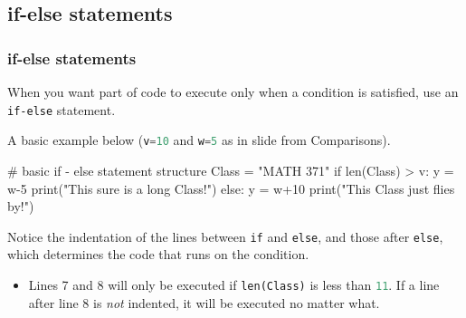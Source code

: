 \documentclass{beamer}
\newenvironment{codeblock}
    {\hfill\begin{beamerboxesrounded}[lower=codecol, width=0.8\textwidth]
    \medskip

    }
    { 
    \end{beamerboxesrounded}\hfill
    }
\theoremstyle{example}
\newcommand{\ct}[1]{\lstinline[language=Python]!#1!}
\newcommand{\ttt}[1]{{\small\texttt{#1}}}
\begin{document}
\subsection{if-else statements}
\begin{frame}[fragile]
\frametitle{{\ttm if-else} statements}

When you want part of code to execute only when a condition is satisfied, use an \ttt{if-else} statement. 

A basic example below (\ct{v=10} and \ct{w=5} as in slide from Comparisons).

\begin{codeblock}

\begin{python}
# basic if - else statement structure
Class = "MATH 371"
if len(Class) > v:
    y = w-5
    print("This sure is a long Class!")
else:
    y = w+10
    print("This Class just flies by!")
\end{python}

\end{codeblock}

\vspace*{12pt}

Notice the indentation of the lines between \ttt{if} and \ttt{else}, and those after \ttt{else}, which determines the code that runs on the condition. 
\begin{itemize}
	\item[] Lines 7 and 8 will only be executed if \ttt{len(Class)} is less than \ct{11}. If a line after line 8 is \emph{not} indented, it will be executed no matter what.
\end{itemize}

\end{frame}
\end{document}
